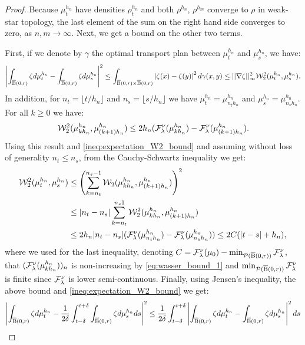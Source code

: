 \begin{proof}
Because $\mu_t^{h_n}$ have densities $\rho_t^{h_n}$ and both $\rho^{h_n}$, $\rho^{h_m}$ converge to $\rho$ in weak-star topology, the last element of the sum on the right hand side converges to zero, as $n,m \rightarrow \infty$. Next, we get a bound on the other two terms.


First, if we denote by $\gamma$ the optimal transport plan between $\mu_t^{h_n}$ and $\mu_s^{h_n}$, we have:
\begin{multline} \label{ineq:expectation_W2_bound}
\left| \int_{\operatorname{\overline{B}}(0,r)} \zeta d\mu_t^{h_n} - \int_{\operatorname{\overline{B}}(0,r)} \zeta d\mu_s^{h_n} \right|^2 \leq \int_{\operatorname{\overline{B}}(0,r) \times \operatorname{\overline{B}}(0,r)} \left| \zeta(x) - \zeta(y) \right|^2 d\gamma(x,y) \leq ||\nabla \zeta||_{\infty}^2 {\cal W}_2^2(\mu_t^{h_n}, \mu_s^{h_n}).
\end{multline}
In addition, for $n_t = \lfloor t/h_n \rfloor$ and $n_s = \lfloor s/h_n \rfloor$ we have $\mu_t^{h_n} = \mu_{n_t h_n}^{h_n}$ and $\mu_s^{h_n} = \mu_{n_s h_n}^{h_n}$. For all $k \geq 0$ we have:
\begin{equation}
  \label{eq:wasser_bound_1}
{\cal W}_2^2(\mu_{kh_n}^{h_n}, \mu_{(k+1)h_n}^{h_n}) \leq 2h_n(\mathcal{F}^{\nu}_{\lambda}(\mu_{kh_n}^{h_n}) - \mathcal{F}^{\nu}_{\lambda}(\mu_{(k+1)h_n}^{h_n})  .  
\end{equation}
Using this result and \eqref{ineq:expectation_W2_bound} and assuming without loss of generality $n_t \leq n_s$, from the Cauchy-Schwartz inequality we get:
\begin{align}
\nonumber
  {\cal W}_2^2(\mu_{t}^{h_n}, \mu_s^{h_n}) & \leq \left( \sum_{k= n_t}^{n_s-1} {\cal W}_2(\mu_{kh_n}^{h_n}, \mu_{(k+1)h_n}^{h_n}) \right)^2 \\
  \nonumber
                                   & \leq |n_t - n_s|\sum_{k=n_t}^{n_s 1} {\cal W}_2^2(\mu_{kh_n}^{h_n}, \mu_{(k+1)h_n}^{h_n}) \\
    \label{eq:wasser_bound_2}
& \leq 2h_n|n_t - n_s|(\mathcal{F}^{\nu}_{\lambda}(\mu_{n_t h_n}^{h_n}) - \mathcal{F}^{\nu}_{\lambda}(\mu_{n_s h_n}^{h_n}))  \leq 2C(|t-s| + h_n),
\end{align}
where we used for the last inequality, denoting $C = \mathcal{F}^{\nu}_{\lambda}(\mu_0) - \min_{{\cal P}(\operatorname{\overline{B}}(0,r))} \mathcal{F}^{\nu}_{\lambda}$, that $(\mathcal{F}^{\nu}_{\lambda}(\mu_{kh_n}^{h_n}))_n$ is non-increasing by \eqref{eq:wasser_bound_1} and $\min_{{\cal P}(\operatorname{\overline{B}}(0,r))} \mathcal{F}^{\nu}_{\lambda}$ is finite since $ \mathcal{F}^{\nu}_{\lambda}$ is lower semi-continuous.
Finally, using Jensen's inequality, the above bound and \ref{ineq:expectation_W2_bound} we get:
\[
\begin{aligned}
\left| \int_{\cB(0,r)} \zeta d\mu_t^{h_n} - \frac{1}{2\delta} \int_{t - \delta}^{t + \delta} \int_{\cB(0,r)} \zeta d\mu_s^{h_n} ds \right|^2 & \leq \frac{1}{2\delta} \int_{t - \delta}^{t + \delta} \left| \int_{\cB(0,r)} \zeta d\mu_{t}^{h_n} - \int_{\cB(0,r)} \zeta d\mu_s^{h_n} \right|^2 ds \\

\end{aligned}\]
\end{proof}
